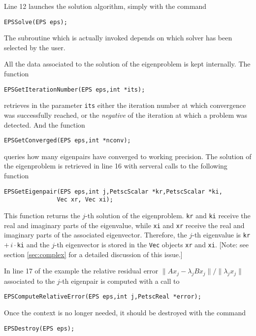 	Line 12 launches the solution algorithm, simply with the command
	\begin{Verbatim}[fontsize=\small]
	EPSSolve(EPS eps);
	\end{Verbatim}
	The subroutine which is actually invoked depends on which solver has been selected by the user. 
        
        All the data associated to the solution of the eigenproblem is kept internally. The function
	\begin{Verbatim}[fontsize=\small]
        EPSGetIterationNumber(EPS eps,int *its);
	\end{Verbatim}
        retrieves in the parameter \texttt{its} either the iteration number at which convergence was successfully reached, or the \emph{negative} of the iteration at which a problem was detected. And the function
	\begin{Verbatim}[fontsize=\small]
	EPSGetConverged(EPS eps,int *nconv);
	\end{Verbatim}
	queries how many eigenpairs have converged to working precision. The solution of the eigenproblem is retrieved in line 16 with serveral calls to the following function
	\begin{Verbatim}[fontsize=\small]
	EPSGetEigenpair(EPS eps,int j,PetscScalar *kr,PetscScalar *ki,
               Vec xr, Vec xi);
	\end{Verbatim}
	\label{GetEigenpair}
	This function returns the $j$-th solution of the eigenproblem. \texttt{kr} and \texttt{ki} receive the real and imaginary parts of the eigenvalue, while \texttt{xi} and \texttt{xr} receive the real and imaginary parts of the associated eigenvector. Therefore, the $j$-th eigenvalue is \texttt{kr}$+\,i\cdot$\texttt{ki} and the $j$-th eigenvector is stored in the \texttt{Vec} objects \texttt{xr} and \texttt{xi}. 
	[Note: see section \ref{sec:complex} for a detailed discussion of this issue.] 
	
	In line 17 of the example the relative residual error $\|Ax_j\!-\!\lambda_jBx_j\|/\|\lambda_jx_j\|$ associated to the $j$-th eigenpair is computed with a call to
	\begin{Verbatim}[fontsize=\small]
	EPSComputeRelativeError(EPS eps,int j,PetscReal *error);
	\end{Verbatim}

	Once the  context is no longer needed, it should be destroyed with the command
	\begin{Verbatim}[fontsize=\small]
	EPSDestroy(EPS eps);
	\end{Verbatim}

